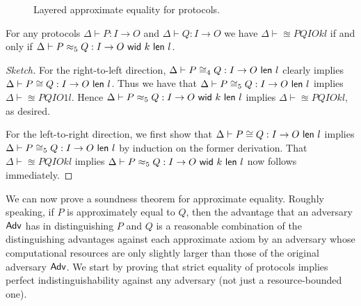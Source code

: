 \begin{figure*}
\caption{Layered approximate equality for \ipdl protocols.}
\label{fig:protocols_lequality_approx}
\end{figure*}

\begin{lemma}\label{lem:lapproxeq}
For any protocols $\Delta \vdash P : I \to O$ and $\Delta \vdash Q : I \to O$ we have $\Delta \vdash \approxeq{P}{Q}{I}{O}{k}{l}$ if and only if $\Delta \vdash \lapproxeq{P}{Q}{I}{O}{k}{l}{5}$.
\end{lemma}

\begin{proof}[Sketch]
For the right-to-left direction, $\Delta \vdash \lapproxcong{P}{Q}{I}{O}{l}{4}$ clearly implies $\Delta \vdash \approxcong{P}{Q}{I}{O}{l}$. Thus we have that $\Delta \vdash \lapproxcong{P}{Q}{I}{O}{l}{5}$ implies $\Delta \vdash \approxeq{P}{Q}{I}{O}{1}{l}$. Hence $\Delta \vdash \lapproxeq{P}{Q}{I}{O}{k}{l}{5}$ implies $\Delta \vdash \approxeq{P}{Q}{I}{O}{k}{l}$, as desired.

For the left-to-right direction, we first show that $\Delta \vdash \approxcong{P}{Q}{I}{O}{l}$ implies $\Delta \vdash \lapproxcong{P}{Q}{I}{O}{l}{5}$ by induction on the former derivation. That $\Delta \vdash \approxeq{P}{Q}{I}{O}{k}{l}$ implies $\Delta \vdash \lapproxeq{P}{Q}{I}{O}{k}{l}{5}$ now follows immediately.
\end{proof}

We can now prove a soundness theorem for approximate equality. Roughly speaking, if $P$ is approximately equal to $Q$, then the advantage that an adversary $\Adv$ has in distinguishing $P$ and $Q$ is a reasonable combination of the distinguishing advantages against each approximate axiom by an adversary whose computational resources are only slightly larger than those of the original adversary $\Adv$. We start by proving that strict equality of protocols implies perfect indistinguishability against any adversary (not just a resource-bounded one). 


